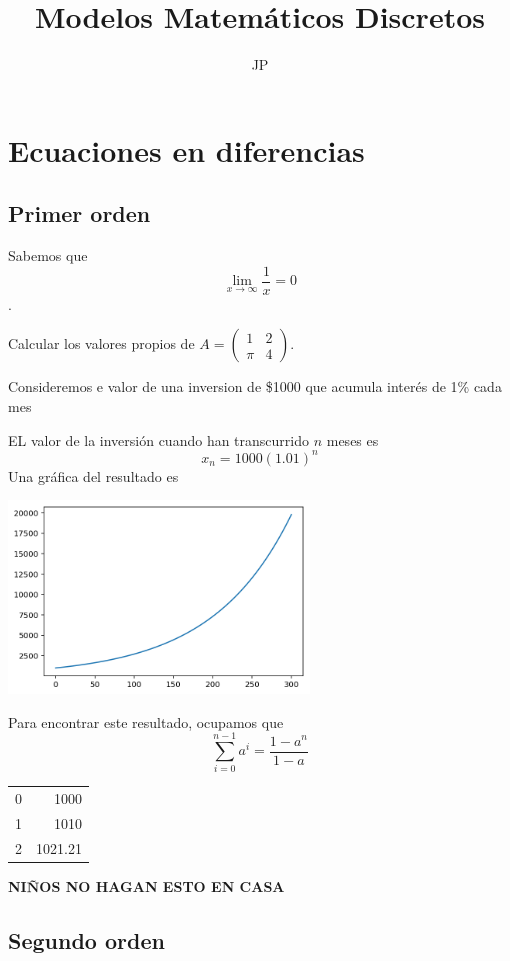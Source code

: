 \documentclass{article}
\title{Modelos Matemáticos Discretos}
\author{JP}
\begin{document}
\maketitle
\section{Ecuaciones en diferencias}
\subsection{Primer orden}

Sabemos que $$\lim_{x\to\infty}\frac{1}{x}=0$$.

Calcular los valores propios de $A=
\begin{pmatrix}
1 & 2 \\
\pi & 4
\end{pmatrix}
.$ 

Consideremos e valor de una inversion de \$1000 que acumula interés de 1\% cada mes


EL valor de la inversión cuando han transcurrido $n$ meses es $$x_n=1000(1.01)^n$$
Una gráfica del resultado es 

\begin{center}
\includegraphics[width=8cm]{grafica}
\end{center}

Para encontrar este resultado, ocupamos que
$$\sum_{i=0}^{n-1}a^i=\frac{1-a^n}{1-a}$$

\begin{center}
\begin{tabular}{|c|r|}
\hline
0 & 1000 \\
1 & 1010\\
2 & 1021.21\\
\hline
\end{tabular}
\end{center}

\begin{center}
\huge
\textbf{NIÑOS NO HAGAN ESTO EN CASA}
\end{center}


\subsection{Segundo orden}
\end{document}
